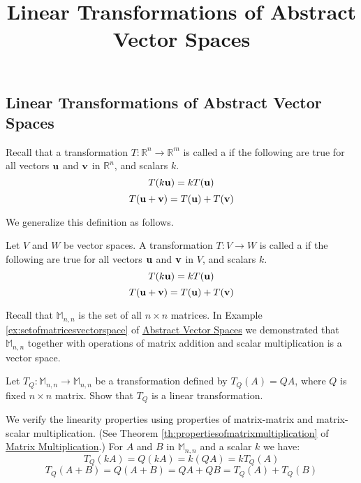 \documentclass{ximera}
\title{Linear Transformations of Abstract Vector Spaces} \license{CC BY-NC-SA 4.0}
\begin{document}
\begin{abstract}
\end{abstract}
\maketitle

\begin{onlineOnly}
\section*{Linear Transformations of Abstract Vector Spaces}
\end{onlineOnly}

Recall that a transformation $T:\mathbb{R}^n\rightarrow \mathbb{R}^m$ is called a  if the following are true for all vectors ${\bf u}$ and ${\bf v}$ in $\mathbb{R}^n$, and scalars $k$.
\begin{equation*}
T(k{\bf u})= kT({\bf u})
\end{equation*}
\begin{equation*}
T({\bf u}+{\bf v})= T({\bf u})+T({\bf v})
\end{equation*}

We generalize this definition as follows.

\begin{definition}\label{def:lintransgeneral}
Let $V$ and $W$ be vector spaces. A transformation $T:V\rightarrow W$ is called a  if the following are true for all vectors ${\bf u}$ and ${\bf v}$ in $V$, and scalars $k$.
\begin{equation*}
T(k{\bf u})= kT({\bf u})
\end{equation*}
\begin{equation*}
T({\bf u}+{\bf v})= T({\bf u})+T({\bf v})
\end{equation*}
\end{definition}

\begin{example}\label{ex:abstvectsplintransM22}
Recall that $\mathbb{M}_{n,n}$ is the set of all $n\times n$ matrices.  In Example \ref{ex:setofmatricesvectorspace} of \href{https://ximera.osu.edu/linearalgebradzv3/LinearAlgebraInteractiveIntro/VSP-0050/main}{Abstract Vector Spaces} we demonstrated that $\mathbb{M}_{n,n}$ together with operations of matrix addition and scalar multiplication is a vector space.

Let $T_Q:\mathbb{M}_{n,n}\rightarrow \mathbb{M}_{n,n}$ be a transformation defined by $T_Q(A)=QA$, where $Q$ is fixed $n\times n$ matrix.  Show that $T_Q$ is a linear transformation.
\begin{explanation}
We verify the linearity properties using properties of matrix-matrix and matrix-scalar multiplication.  (See Theorem \ref{th:propertiesofmatrixmultiplication} of \href{https://ximera.osu.edu/linearalgebradzv3/LinearAlgebraInteractiveIntro/MAT-0020/main}{Matrix Multiplication}.)  For $A$ and $B$ in $\mathbb{M}_{n,n}$ and a scalar $k$ we have:
$$T_Q(kA)=Q(kA)=k(QA)=kT_Q(A)$$
$$T_Q(A+B)=Q(A+B)=QA+QB=T_Q(A)+T_Q(B)$$
\end{explanation}
\end{example}
\end{document}
